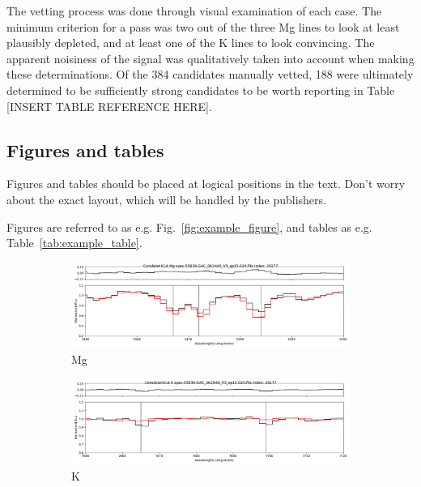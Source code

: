 \documentclass[a4paper,fleqn,usenatbib]{mnras}
\begin{document}
The vetting process was done through visual examination of each case. The minimum criterion for a pass was two out of the three Mg lines to look at least plausibly depleted, and at least one of the K lines to look convincing. The apparent noisiness of the signal was qualitatively taken into account when making these determinations. Of the 384 candidates manually vetted, 188 were ultimately determined to be sufficiently strong candidates to be worth reporting in Table [INSERT TABLE REFERENCE HERE].

\subsection{Figures and tables}

Figures and tables should be placed at logical positions in the text. Don't
worry about the exact layout, which will be handled by the publishers.

Figures are referred to as e.g. Fig.~\ref{fig:example_figure}, and tables as
e.g. Table~\ref{tab:example_table}.




\begin{figure}
\centering
\begin{subfigure}{.5\linewidth}
  \centering
  \includegraphics[width=.95\linewidth]{29277_Mg}
  \caption{Mg}
  \label{Mgposter}
\end{subfigure}%

\begin{subfigure}{.5\linewidth}
  \centering
  \includegraphics[width=.95\linewidth]{29277_K}
  \caption{K}
  \label{Kposter}
\end{subfigure}
\caption{}
\label{posterchildren}
\end{figure} 
\end{document}
